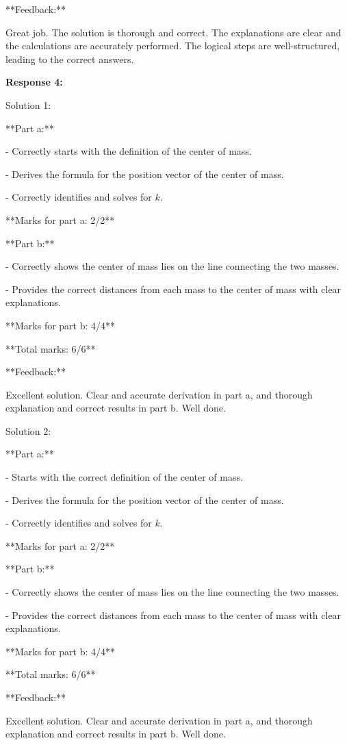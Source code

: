 \documentclass[a4paper,11pt]{article}
\begin{document}
**Feedback:**

Great job. The solution is thorough and correct. The explanations are clear and the calculations are accurately performed. The logical steps are well-structured, leading to the correct answers.

\bigskip
\textbf{Response 4:}

Solution 1:

**Part a:**

- Correctly starts with the definition of the center of mass.

- Derives the formula for the position vector of the center of mass.

- Correctly identifies and solves for \( k \).

**Marks for part a: 2/2**

**Part b:**

- Correctly shows the center of mass lies on the line connecting the two masses.

- Provides the correct distances from each mass to the center of mass with clear explanations.

**Marks for part b: 4/4**

**Total marks: 6/6**

**Feedback:**

Excellent solution. Clear and accurate derivation in part a, and thorough explanation and correct results in part b. Well done.

Solution 2:

**Part a:**

- Starts with the correct definition of the center of mass.

- Derives the formula for the position vector of the center of mass.

- Correctly identifies and solves for \( k \).

**Marks for part a: 2/2**

**Part b:**

- Correctly shows the center of mass lies on the line connecting the two masses.

- Provides the correct distances from each mass to the center of mass with clear explanations.

**Marks for part b: 4/4**

**Total marks: 6/6**

**Feedback:**

Excellent solution. Clear and accurate derivation in part a, and thorough explanation and correct results in part b. Well done.
\end{document}
